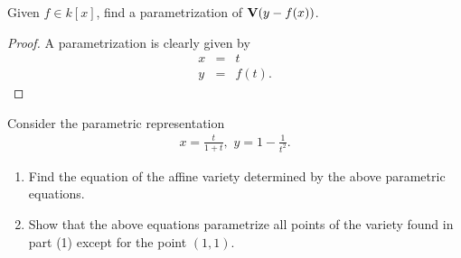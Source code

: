 \begin{exercise}{3}
Given $f\in k[x]$, find a parametrization of $\mathbf{V}(y - f(x))$.
\end{exercise}
\begin{proof}
    A parametrization is clearly given by
    \begin{eqnarray*}
        x & = & t\\
        y & = & f(t).
    \end{eqnarray*}
\end{proof}

\begin{exercise}{4}
Consider the parametric representation
\begin{align*}
    x=\frac{t}{1+t},\,\,y=1-\frac{1}{t^2}.
\end{align*}
\begin{enumerate}
    \item Find the equation of the affine variety determined by the above parametric equations.
    \item Show that the above equations parametrize all points of the variety found in part (1) except for the point $(1,1)$.
\end{enumerate}
\end{exercise}
